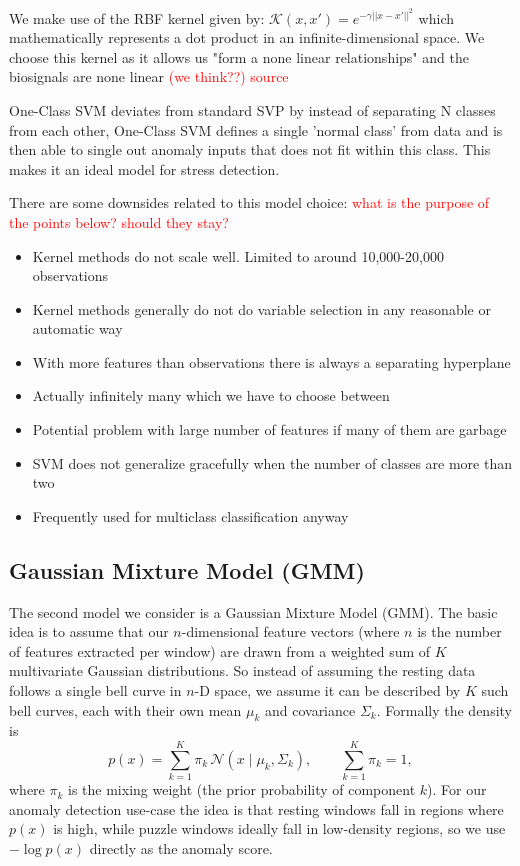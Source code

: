 \documentclass{article}
\begin{document}
We make use of the RBF kernel given by:  
$\mathcal{K}(x,x')=e^{-\gamma||x-x'||^2}$
which mathematically represents a dot product in an infinite-dimensional space.  We choose this kernel as it allows us "form a none linear relationships"  and the biosignals are none linear \textcolor{red}{(we think??) source}

One-Class SVM deviates from standard SVP by instead of separating N classes from each other, One-Class SVM defines a single 'normal class' from data and is then able to single out anomaly inputs that does not fit within this class. This makes it an ideal model for stress detection. 


There are some downsides related to this model choice: \textcolor{red}{what is the purpose of the points below? should they stay?} 
\begin{itemize}
    \item Kernel methods do not scale well. Limited to around 10,000-20,000 observations
    \item Kernel methods generally do not do variable selection in any reasonable or automatic way
    \item With more features than observations there is always a separating hyperplane
    \item Actually infinitely many which we have to choose between
    \item Potential problem with large number of features if many of them are garbage
    \item SVM does not generalize gracefully when the number of classes are more than two
    \item Frequently used for multiclass classification anyway
\end{itemize}

\subsection*{Gaussian Mixture Model (GMM)}
\noindent
The second model we consider is a Gaussian Mixture Model (GMM). The basic idea is to assume that our $n$-dimensional feature vectors (where $n$ is the number of features extracted per window) are drawn from a weighted sum of $K$ multivariate Gaussian distributions. So instead of assuming the resting data follows a single bell curve in $n$-D space, we assume it can be described by $K$ such bell curves, each with their own mean $\mu_k$ and covariance $\Sigma_k$. Formally the density is
\begin{equation}
    p(x) = \sum_{k=1}^{K} \pi_k \, \mathcal{N}(x \mid \mu_k, \Sigma_k), \qquad \sum_{k=1}^{K} \pi_k = 1,
\end{equation}
where $\pi_k$ is the mixing weight (the prior probability of component $k$). For our anomaly detection use-case the idea is that resting windows fall in regions where $p(x)$ is high, while puzzle windows ideally fall in low-density regions, so we use $-\log p(x)$ directly as the anomaly score.
\end{document}
